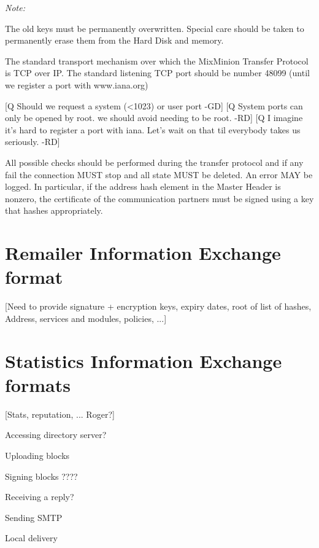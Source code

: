 \emph{Note:}

The old keys must be permanently overwritten. Special care should be
taken to permanently erase them from the Hard Disk and memory. 

The standard transport mechanism over which the MixMinion Transfer
Protocol is TCP over IP. The standard listening TCP port should be 
number 48099 (until we register a port with www.iana.org)

[Q Should we request a system (<1023) or user port -GD]
[Q System ports can only be opened by root. we should avoid needing
to be root. -RD]
[Q I imagine it's hard to register a port with iana. Let's wait on
that til everybody takes us seriously. -RD]

All possible checks should be performed during the transfer protocol
and if any fail the connection MUST stop and all state MUST
be deleted. An error MAY be logged. In particular, if the address
hash element in the Master Header is nonzero, the certificate of
the communication partners must be signed using a key that hashes
appropriately.

\section{Remailer Information Exchange format}

[Need to provide signature + encryption keys, expiry dates, root of
list of hashes, Address, services and modules, policies, ...]

\section{Statistics Information Exchange formats}

[Stats, reputation, ... Roger?]

Accessing directory server?

Uploading blocks

Signing blocks ????

Receiving a reply?

Sending SMTP

Local delivery

